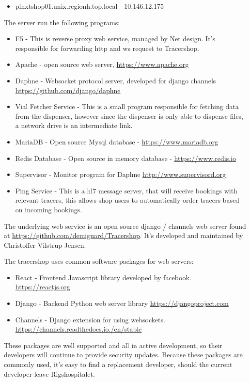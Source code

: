 \documentclass{article}
\begin{document}
\begin{itemize}
  \item[] plnxtshop01.unix.regionh.top.local - 10.146.12.175
\end{itemize}
The server run the following programs:

\begin{itemize}
  \item F5 - This is reverse proxy web service, managed by Net design. It's
  responsible for forwarding http and ws request to Tracershop.
  \item Apache - open source web server, \url{https://www.apache.org}
  \item Daphne - Websocket protocol server, developed for django channels
  \url{https://github.com/django/daphne}
  \item Vial Fetcher Service - This is a small program responsible for fetching
  data from the dispenser, however since the dispenser is only able to dispense
  files, a network drive is an intermediate link.
  \item MariaDB - Open source Mysql database - \url{https://www.mariadb.org}
  \item Redis Database - Open source in memory database - \url{https://www.redis.io}
  \item Supervisor - Monitor program for Daphne \url{http://www.supervisord.org}
  \item Ping Service - This is a hl7 message server, that will receive bookings
  with relevant tracers, this allows shop users to automatically order tracers
  based on incoming bookings.
\end{itemize}
The underlying web service is an open source django / channels web server found
at \url{https://github.com/demiguard/Tracershop}. It's developed and maintained
by Christoffer Vilstrup Jensen.

The tracershop uses common software packages for web servers:
\begin{itemize}
  \item React - Frontend Javascript library developed by facebook.
  \url{https://reactjs.org}
  \item Django - Backend Python web server library
  \url{https://djangoproject.com}
  \item Channels - Django extension for using websockets.
  \url{https://channels.readthedocs.io./en/stable}
\end{itemize}
These packages are well supported and all in active development,
so their developers will continue to provide security updates.
Because these packages are commonly used, it's easy to find a replacement
developer, should the current developer leave Rigshospitalet.
\end{document}
